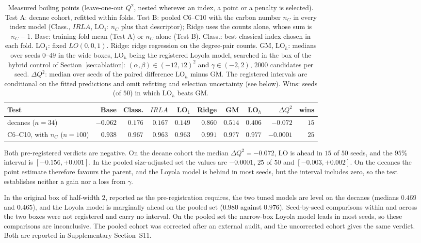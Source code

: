 \documentclass[a5paper, 10pt]{article}
\theoremstyle{plain}
\theoremstyle{remark}
\theoremstyle{definition}
\begin{document}
\begin{table}[htbp]
\centering
\caption{Measured boiling points (leave-one-out $Q^2$, nested wherever an index, a point or a penalty is selected). Test A:
decane cohort, refitted within folds. Test B: pooled C6--C10 with the carbon number
$n_C$ in every index model (Class., $IRLA$,
LO$_1$: $n_C$ plus that descriptor); Ridge uses the counts alone, whose sum is $n_C - 1$. Base: training-fold mean (Test A)
or $n_C$ alone (Test B).
Class.: best classical index chosen in each fold. LO$_1$: fixed
$LO(0,0,1)$. Ridge: ridge regression on the degree-pair counts. GM,
LO$_h$: medians over seeds $0$--$49$ in the wide boxes, LO$_h$
being the registered Loyola model, searched in the box of the hybrid control of Section~\ref{sec:ablation}: $(\alpha,\beta) \in (-12,12)^2$ and
$\gamma \in (-2,2)$, $2000$ candidates per seed.
$\Delta Q^2$: median over seeds of the paired difference LO$_h$ minus GM. The registered intervals are conditional on the fitted predictions and omit refitting and selection uncertainty (see below). Wins: seeds (of $50$) in
which LO$_h$ beats GM.}
\label{tab:bp}
\scriptsize
\setlength{\tabcolsep}{1.5pt}
\begin{tabular}{lrrrrrrrrr}
\toprule
Test & Base & Class. & $IRLA$ & LO$_1$ & Ridge & GM & LO$_h$ & $\Delta Q^2$ & wins\\
\midrule
decanes ($n = 34$) & $-0.062$ & $0.176$ & $0.167$ & $0.149$ & $0.860$ & $0.514$ & $0.406$ & $-0.072$ & $15$\\
C6--C10, with $n_C$ ($n = 100$) & $0.938$ & $0.967$ & $0.963$ & $0.963$ & $0.991$ & $0.977$ & $0.977$ & $-0.0001$ & $25$\\
\bottomrule
\end{tabular}
\end{table}

Both pre-registered verdicts are negative. On the decane cohort the
median $\Delta Q^2 = -0.072$, LO is ahead in $15$ of $50$ seeds, and the
$95\%$ interval is $[-0.156, +0.001]$. In the pooled size-adjusted set
the values are $-0.0001$, $25$ of $50$ and $[-0.003, +0.002]$.
On the decanes the point estimate therefore favours the parent, and the
Loyola model is behind in most seeds, but the interval includes zero, so
the test establishes neither a gain nor a loss from $\gamma$.

In the
original box of half-width $2$, reported as the pre-registration
requires, the two tuned models are level on the decanes (medians $0.469$
and $0.465$), and the Loyola model is marginally ahead on the pooled set
($0.980$ against $0.976$). Seed-by-seed comparisons within and across the two boxes were not registered and carry no interval. On the pooled set the narrow-box Loyola model leads in most seeds, so these comparisons are inconclusive. The pooled cohort was corrected after an external audit, and the uncorrected cohort gives the same verdict. Both are reported in Supplementary Section~S11.
\end{document}
